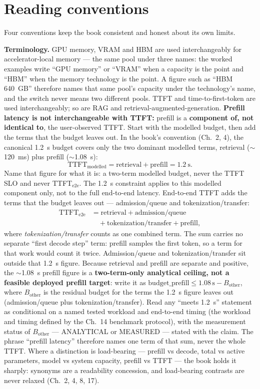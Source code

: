 \section*{Reading conventions}

Four conventions keep the book consistent and honest about its own limits.

\textbf{Terminology.} GPU memory, VRAM and HBM are used interchangeably for
accelerator-local memory --- the same pool under three names: the worked
examples write ``GPU memory'' or ``VRAM'' when a capacity is the point and
``HBM'' when the memory technology is the point. A figure such as ``HBM
640~GB'' therefore names that same pool's capacity under the technology's
name, and the switch never means two different pools. TTFT and
time-to-first-token are
used interchangeably; so are RAG and retrieval-augmented-generation.
\textbf{Prefill latency is not interchangeable with TTFT:} prefill is a
\textbf{component of, not identical to}, the user-observed TTFT. Start
with the modelled budget, then add the terms that the budget leaves out.
In the book's convention (Ch.~2, 4), the canonical 1.2~s budget covers
only the two dominant modelled terms, retrieval ($\sim$120~ms) plus
prefill ($\sim$1.08~s):
\[
\text{TTFT}_{\text{modelled}} = \text{retrieval} + \text{prefill} = 1.2~\text{s}.
\]
Name that figure for what it is: a two-term modelled budget, never the
TTFT SLO and never TTFT$_{\text{e2e}}$. The 1.2~s constraint applies to
this modelled component only, not to the full end-to-end latency.
End-to-end TTFT adds the terms that the budget leaves out ---
admission/queue and tokenization/transfer:
\[
\begin{aligned}
\text{TTFT}_{\text{e2e}} &= \text{retrieval} + \text{admission/queue} \\
&\quad + \text{tokenization/transfer} + \text{prefill},
\end{aligned}
\]
where \emph{tokenization/transfer} counts as one combined term. The sum
carries no separate ``first decode step'' term: prefill samples the first
token, so a term for that work would count it twice. Admission/queue and
tokenization/transfer sit outside that 1.2~s figure. Because retrieval
and prefill are separate and positive, the $\sim$1.08~s prefill figure is
a \textbf{two-term-only analytical ceiling, not a feasible deployed prefill
target}: write it as
$\text{budget\_prefill} \le 1.08\,\mathrm{s} - B_\text{other}$, where
$B_\text{other}$ is the residual budget for the terms the 1.2~s figure
leaves out (admission/queue plus tokenization/transfer). Read any ``meets
1.2~s'' statement as conditional on a named tested workload and end-to-end
timing
(the workload and timing defined by the Ch.~14 benchmark protocol), with the
measurement status of $B_\text{other}$ --- ANALYTICAL or MEASURED --- stated
with the claim. The phrase ``prefill latency'' therefore names one term of that sum,
never the whole TTFT. Where a distinction is load-bearing --- prefill vs
decode, total vs active parameters, model vs system capacity, prefill vs
TTFT --- the book holds it sharply: synonyms are a readability concession,
and load-bearing contrasts are never relaxed (Ch.~2, 4, 8, 17).

